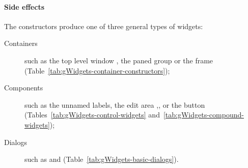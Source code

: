 \paragraph{Side effects}
The constructors produce one of three general types of widgets:
\begin{description}
\item[Containers] such as the top level window , the paned
  group  or the frame 
 (Table~\ref{tab:gWidgets-container-constructors});
%
\item[Components] such as the unnamed labels, the edit area
  ,, or the button 
  (Tables~\ref{tab:gWidgets-control-widgets}
  and~\ref{tab:gWidgets-compound-widgets});
%
\item[Dialogs] such as  and  (Table~\ref{tab:gWidgets-basic-dialogs}).
\end{description}








